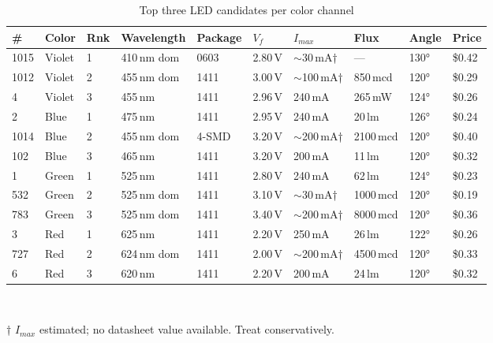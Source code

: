 \documentclass[12pt,letterpaper]{article}
\begin{document}
\renewcommand{\arraystretch}{1.3}
\begin{table}[H]
\centering
\small
\caption{Top three LED candidates per color channel}
\label{tab:candidates}
\begin{tabular}{C{0.4cm} L{1.0cm} C{0.5cm} C{1.3cm} C{1.1cm} C{1.0cm} C{1.0cm} C{1.5cm} C{1.3cm} C{0.7cm}}
\toprule
\# & \textbf{Color} & \textbf{Rnk} & \textbf{Wavelength} & \textbf{Package} & $V_f$ & $I_{max}$ & \textbf{Flux} & \textbf{Angle} & \textbf{Price} \\
\midrule
{}
1015 & Violet & 1 & 410\,nm dom & 0603 & 2.80\,V & $\sim$30\,mA† & --- & 130° & \$0.42 \\
1012 & Violet & 2 & 455\,nm dom & 1411 & 3.00\,V & $\sim$100\,mA† & 850\,mcd & 120° & \$0.29 \\
4    & Violet & 3 & 455\,nm     & 1411 & 2.96\,V & 240\,mA & 265\,mW & 124° & \$0.26 \\
\midrule
{}
2    & Blue   & 1 & 475\,nm     & 1411 & 2.95\,V & 240\,mA & 20\,lm & 126° & \$0.24 \\
1014 & Blue   & 2 & 455\,nm dom & 4-SMD & 3.20\,V & $\sim$200\,mA† & 2100\,mcd & 120° & \$0.40 \\
102  & Blue   & 3 & 465\,nm     & 1411 & 3.20\,V & 200\,mA & 11\,lm & 120° & \$0.32 \\
\midrule
{}
1    & Green  & 1 & 525\,nm     & 1411 & 2.80\,V & 240\,mA & 62\,lm & 124° & \$0.23 \\
532  & Green  & 2 & 525\,nm dom & 1411 & 3.10\,V & $\sim$30\,mA† & 1000\,mcd & 120° & \$0.19 \\
783  & Green  & 3 & 525\,nm dom & 1411 & 3.40\,V & $\sim$200\,mA† & 8000\,mcd & 120° & \$0.36 \\
\midrule
{}
3    & Red    & 1 & 625\,nm     & 1411 & 2.20\,V & 250\,mA & 26\,lm & 122° & \$0.26 \\
727  & Red    & 2 & 624\,nm dom & 1411 & 2.00\,V & $\sim$200\,mA† & 4500\,mcd & 120° & \$0.33 \\
6    & Red    & 3 & 620\,nm     & 1411 & 2.20\,V & 200\,mA & 24\,lm & 120° & \$0.32 \\
\bottomrule
\end{tabular}\\[4pt]
\raggedright\footnotesize † $I_{max}$ estimated; no datasheet value available. Treat conservatively.
\end{table}
\end{document}
